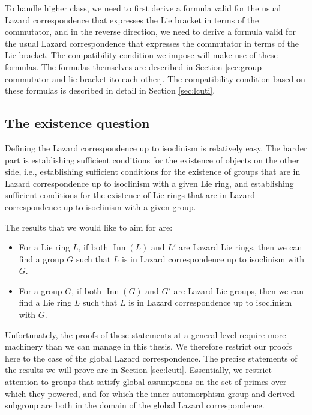 To handle higher class, we need to first derive a formula valid for
the usual Lazard correspondence that expresses the Lie bracket in
terms of the commutator, and in the reverse direction, we need to
derive a formula valid for the usual Lazard correspondence that
expresses the commutator in terms of the Lie bracket. The
compatibility condition we impose will make use of these formulas. The
formulas themselves are described in Section
\ref{sec:group-commutator-and-lie-bracket-ito-each-other}. The
compatibility condition based on these formulas is described in detail
in Section \ref{sec:lcuti}.


\subsection{The existence question}\label{sec:existence-question}

Defining the Lazard correspondence up to isoclinism is relatively
easy. The harder part is establishing sufficient conditions for the
existence of objects on the other side, i.e., establishing sufficient
conditions for the existence of groups that are in Lazard
correspondence up to isoclinism with a given Lie ring, and
establishing sufficient conditions for the existence of Lie rings that
are in Lazard correspondence up to isoclinism with a given group.

The results that we would like to aim for are:

\begin{itemize}

\item For a Lie ring $L$, if both $\operatorname{Inn}(L)$ and $L'$ are
  Lazard Lie rings, then we can find a group $G$ such that $L$ is in
  Lazard correspondence up to isoclinism with $G$.
\item For a group $G$, if both $\operatorname{Inn}(G)$ and $G'$ are
  Lazard Lie groups, then we can find a Lie ring $L$ such that $L$ is
  in Lazard correspondence up to isoclinism with $G$.
\end{itemize}

Unfortunately, the proofs of these statements at a general level
require more machinery than we can manage in this thesis. We
therefore restrict our proofs here to the case of the global Lazard
correspondence. The precise statements of the results we will prove
are in Section \ref{sec:lcuti}. Essentially, we restrict attention to
groups that satisfy global assumptions on the set of primes over which
they powered, and for which the inner automorphism group and derived
subgroup are both in the domain of the global Lazard correspondence.

